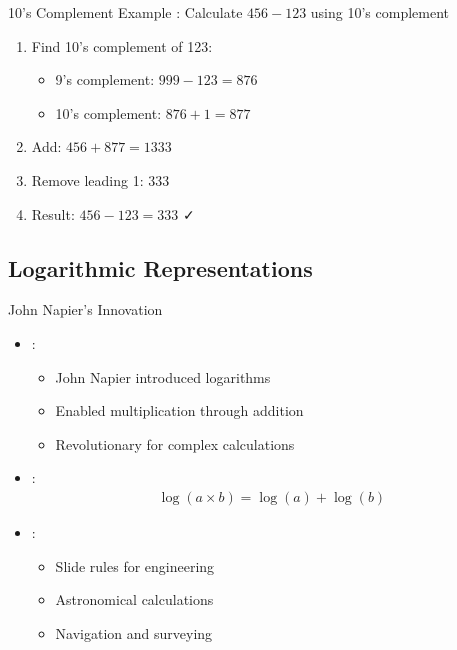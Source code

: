 \begin{frame}{10's Complement Example}
: Calculate $456 - 123$ using 10's complement

\vspace{0.3cm}
\begin{enumerate}
\item Find 10's complement of 123:
\begin{itemize}
\item 9's complement: $999 - 123 = 876$
\item 10's complement: $876 + 1 = 877$
\end{itemize}

\item Add: $456 + 877 = 1333$

\item Remove leading 1: $333$

\item Result: $456 - 123 = 333$ ✓
\end{enumerate}
\end{frame}

\subsection{Logarithmic Representations}

\begin{frame}{John Napier's Innovation}
\begin{itemize}
\item {}:
\begin{itemize}
\item John Napier introduced logarithms
\item Enabled multiplication through addition
\item Revolutionary for complex calculations
\end{itemize}
\vspace{0.5cm}
\item {}:
\begin{align}
\log(a \times b) = \log(a) + \log(b)
\end{align}
\item {}:
\begin{itemize}
\item Slide rules for engineering
\item Astronomical calculations
\item Navigation and surveying
\end{itemize}
\end{itemize}
\end{frame}

